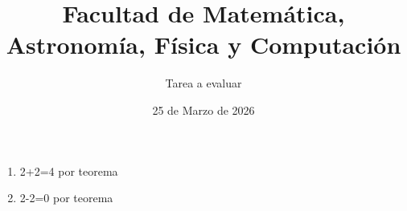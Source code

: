 \documentclass[a4paper]{article}
\title{Facultad de Matemática, Astronomía, Física y Computación}
\author{Tarea a evaluar}
\date{25 de Marzo de 2026}
\begin{document}
\maketitle
\begin{enumerate}
    \item 2+2=4 por teorema
    \item 2-2=0 por teorema
\end{enumerate}
\end{document}

